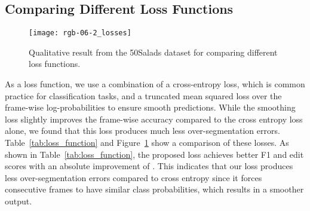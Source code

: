 \documentclass[10pt,twocolumn,letterpaper]{article}
\begin{document}
\subsection{Comparing Different Loss Functions}

\begin{table}[tb]
\centering
{}
\caption{Comparing different loss functions on the 50Salads dataset.}
\label{tab:loss_function}
\end{table}

\begin{figure}[tb]
\begin{center}
   \texttt{[image: rgb-06-2\_losses]}
\end{center}
   \caption{Qualitative result from the 50Salads dataset for comparing different loss functions.}
\label{fig:loss_functions}
\end{figure}

As a loss function, we use a combination of a cross-entropy loss, which 
is common practice for classification tasks, and a truncated mean squared 
loss over the frame-wise log-probabilities to ensure smooth predictions. 
While the smoothing loss slightly improves the frame-wise accuracy compared to 
the cross entropy loss alone, we found that this loss produces much less 
over-segmentation errors. Table~\ref{tab:loss_function} and 
Figure~\ref{fig:loss_functions} show a comparison of these losses. 
As shown in Table~\ref{tab:loss_function}, the proposed loss achieves 
better F1 and edit scores with an absolute improvement of . This 
indicates that our loss produces less over-segmentation errors compared 
to cross entropy since it forces consecutive frames to have 
similar class probabilities, which results in a smoother output. 
\end{document}
